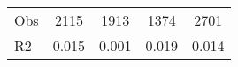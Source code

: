 \begin{tabular}{l*{4}{c}}
\hline                                                                                                                                                                                                                                            
 Obs                   &               2115               &       1913                       &       1374                &              2701                                               \\ 
 R2                    &                      0.015              &              0.001                      &              0.019               &                     0.014                                              \\ 
\hline \end{tabular}                                                                                                                                                                                                              